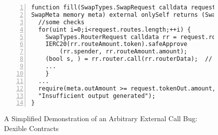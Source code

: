 \begin{figure}[t]
\begin{lstlisting}[numbers=left,stepnumber=1,xleftmargin=1em,numberstyle=\ttfamily\color{gray},numbersep=3pt]
function fill(SwapTypes.SwapRequest calldata request, 
SwapMeta memory meta) external onlySelf returns (SwapMeta memory)  {
  //some checks
  for(uint i=0;i<request.routes.length;++i) {
    SwapTypes.RouterRequest calldata rr = request.routes[i];
    IERC20(rr.routeAmount.token).safeApprove
        (rr.spender, rr.routeAmount.amount);
    (bool s, ) = rr.router.call(rr.routerData);  // vulnerable
    ...
    }
  ...
  require(meta.outAmount >= request.tokenOut.amount,
  "Insufficient output generated");
}
\end{lstlisting}

\caption{A Simplified Demonstration of an Arbitrary External Call Bug: Dexible Contracts}
\label{fig:dexibleHack}
\end{figure}



\begin{comment}
\begin{figure}[t]
\begin{lstlisting}[numbers=left,stepnumber=1,xleftmargin=1em,numberstyle=\ttfamily\color{gray},numbersep=3pt]
struct SwapData {
  address callTo;
  bytes callData;
  ...
}
function swap(bytes32 transactionId, SwapData calldata _swap) 
  internal {
  ... // some balance check
  meta.outAmount = request.tokenOut.token.balanceOf(address(this));
  (bool success, bytes memory res) = _swap.callTo.call{
    value: nativeValue
  }(_swap.callData);
  if (!success) {
    string memory reason = LibUtil.getRevertMsg(res);
    revert(reason);
  }
  ...
}

\end{lstlisting}

\caption{A Simplified Demonstration of an Arbitrary External Call Bug: LiFi Contracts}
\label{fig:lifi_example}
\end{figure}

\begin{figure}[t]
\label{fig:lifi_solution}
\begin{lstlisting}[language=Consol]
swap (transactionId, _swap) 
requires {(_swap.callTo == XXX && _swap.callData[:4] == YYY) || ...}
\end{lstlisting}

\begin{lstlisting}[language=Consol]
swap (transactionId, _swap) 
where { _swap.callTo.call(data) returns (success, res)
    requires {_swap.callTo == XXX && data[:4] == YYY) || ...}
    ensure {success}
}
\end{lstlisting}
\caption{\lang Specifications for LiFi attack.}
\label{fig:lifi_solution}
\end{figure}

\end{comment}
